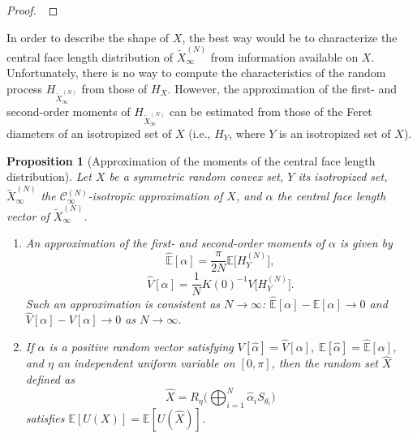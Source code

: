 \documentclass[numbers,compress,v1.0.1]{vmsta}
\newtheorem{proposition}{Proposition}
\theoremstyle{definition}
\begin{document}
\begin{proof}
$\:$
%
%
\end{proof}

In order to describe the shape of $X$, the best way would be to
characterize the central face length distribution of $\tilde{X}_\infty
^{(N)}$ from information available on $X$. Unfortunately, there is no
way to compute the characteristics of the random process $H_{\tilde
{X}_\infty^{(N)}}$ from those of $H_{X}$. However, the approximation of
the first- and second-order moments of $H_{\tilde{X}_\infty^{(N)}}$ can
be estimated from those of the Feret diameters of an isotropized set of
$X$ (i.e., $H_{Y}$, where $Y$ is an isotropized set of $X$).

\begin{proposition}[Approximation of the moments of the central
face length distribution] Let $X$ be a symmetric random convex set,
$Y$ its isotropized set, $\tilde{X}_\infty^{(N)}$ the $\mathcal
{C}_\infty^{(N)}$-isotropic approximation of $X$, and $\alpha$ the
central face length vector of $\tilde{X}_\infty^{(N)}$.
%
\begin{enumerate}
%
\item An approximation of the first- and second-order moments of $\alpha
$ is given by
%
\begin{equation}
\hat{\mathbb{E}}[\alpha ]=
\frac{\pi}{2N}\mathbb{E}\bigl[H_Y^{(N)}\bigr],
\end{equation}
%
\begin{equation}
\hat{V}[\alpha]=\frac{1}{N}K(0)^{-1}V\bigl[H_Y^{(N)}
\bigr].
\end{equation}
%
Such an approximation is consistent as $N\rightarrow\infty$: $\hat
{\mathbb{E}}[\alpha]-\mathbb{E}[\alpha]\rightarrow0 $ and $\hat
{V}[\alpha]-V[\alpha]\rightarrow0 $ as $N\rightarrow\infty$.
%
\item If $\hat{\alpha}$ is a positive random vector satisfying $V[\hat
{\alpha}]=\hat{V}[\alpha],\;\mathbb{E}[\hat{\alpha}]=\hat{\mathbb
{E}}[\alpha]$, and $\eta$ an independent uniform variable on $[0,\pi]$,
then the random set $\hat{X}$ defined as
%
\begin{equation}
\hat{X}=R_\eta\Biggl(\bigoplus_{i=1}^N
\hat{\alpha}_i S_{\theta_i}\Biggr)
\end{equation}
%
satisfies $\mathbb{E}[U(X)]=\mathbb{E}[U(\hat{X})]$.
\end{enumerate}
\end{proposition}
\end{document}
